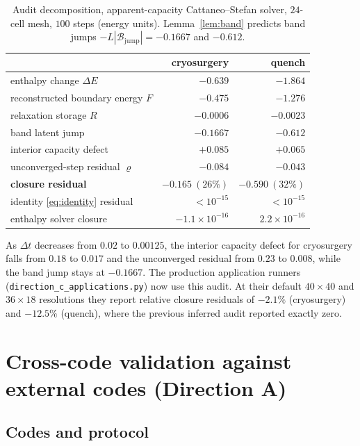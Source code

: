 \documentclass[11pt]{article}
\numberwithin{equation}{section}
\theoremstyle{remark}
\begin{document}
\begin{table}[h]
\centering
\caption{Audit decomposition, apparent-capacity Cattaneo--Stefan solver, $24$-cell
mesh, $100$ steps (energy units).  Lemma~\ref{lem:band} predicts band jumps
$-L|\mathcal B_{\mathrm{jump}}|=-0.1667$ and $-0.612$.}
\begin{tabular}{@{}lrr@{}}
\toprule
& cryosurgery & quench \\
\midrule
enthalpy change $\Delta E$ & $-0.639$ & $-1.864$ \\
reconstructed boundary energy $F$ & $-0.475$ & $-1.276$ \\
relaxation storage $R$ & $-0.0006$ & $-0.0023$ \\
band latent jump & $-0.1667$ & $-0.612$ \\
interior capacity defect & $+0.085$ & $+0.065$ \\
unconverged-step residual $\varrho$ & $-0.084$ & $-0.043$ \\
\textbf{closure residual} & $-0.165\ (26\%)$ & $-0.590\ (32\%)$ \\
identity \eqref{eq:identity} residual & $<10^{-15}$ & $<10^{-15}$ \\
enthalpy solver closure & $-1.1\times10^{-16}$ & $2.2\times10^{-16}$ \\
\bottomrule
\end{tabular}
\label{tab:C}
\end{table}

As $\Delta t$ decreases from $0.02$ to $0.00125$, the interior capacity defect
for cryosurgery falls from $0.18$ to $0.017$ and the unconverged residual from
$0.23$ to $0.008$, while the band jump stays at $-0.1667$.  The production
application runners (\texttt{direction\_c\_applications.py}) now use this
audit.  At their default $40\times40$ and $36\times18$ resolutions they report
relative closure residuals of $-2.1\%$ (cryosurgery) and $-12.5\%$ (quench),
where the previous inferred audit reported exactly zero.

\section{Cross-code validation against external codes (Direction A)}

\subsection{Codes and protocol}
\end{document}
